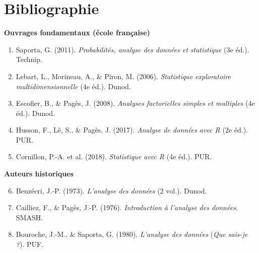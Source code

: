 \documentclass[11pt, a4paper, openany]{book}
\theoremstyle{plain}
\theoremstyle{definition}
\theoremstyle{remark}
\newcommand{\1}{\mathds{1}}
\begin{document}
\chapter*{Bibliographie}

\textbf{Ouvrages fondamentaux (école française)}
\begin{enumerate}
  \item Saporta, G. (2011). \textit{Probabilités, analyse des données et statistique} (3e éd.). Technip.
  \item Lebart, L., Morineau, A., \& Piron, M. (2006). \textit{Statistique exploratoire multidimensionnelle} (4e éd.). Dunod.
  \item Escofier, B., \& Pagès, J. (2008). \textit{Analyses factorielles simples et multiples} (4e éd.). Dunod.
  \item Husson, F., Lê, S., \& Pagès, J. (2017). \textit{Analyse de données avec R} (2e éd.). PUR.
  \item Cornillon, P.-A. et al. (2018). \textit{Statistique avec R} (4e éd.). PUR.
\end{enumerate}

\textbf{Auteurs historiques}
\begin{enumerate}
  \setcounter{enumi}{5}
  \item Benzécri, J.-P. (1973). \textit{L'analyse des données} (2 vol.). Dunod.
  \item Cailliez, F., \& Pagès, J.-P. (1976). \textit{Introduction à l'analyse des données}. SMASH.
  \item Bouroche, J.-M., \& Saporta, G. (1980). \textit{L'analyse des données} (\textit{Que sais-je ?}). PUF.
\end{enumerate}
\end{document}
